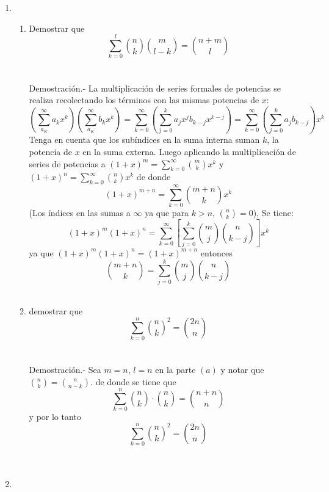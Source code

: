 \begin{enumerate}[\bfseries 1.]
      \item 
        \begin{enumerate}[\bfseries (a)]
        \item Demostrar que $$\displaystyle\sum_{k=0}^{l} {n \choose k} {m \choose l-k} = {n+m \choose l}$$\\\\
        Demostración.- \; La multiplicación de series formales de potencias se realiza recolectando los términos con las mismas potencias de $x$: 
        $$\left( \sum\limits_{a_K}^{\infty} a_k x^k \right) \left( \sum\limits_{a_K}^{\infty} b_k x^k \right) = \sum\limits_{k=0}^{\infty} \left(\sum\limits_{j=0}^{k} a_j x^j b_{k-j} x^{k-j}  \right) = \sum\limits_{k=0}^{\infty} \left(\sum\limits_{j=0}^{k} a_j  b_{k-j}   \right) x^k$$
        Tenga en cuenta que los subíndices en la suma interna suman $k$, la potencia de $x$ en la suma externa.
        Luego aplicando la multiplicación de series de potencias a $(1+x)^m = \sum\limits_{k=0}^{\infty} {m \choose k}x^k$ y $(1+x)^n = \sum\limits_{k=0}^{\infty} {n \choose k}x^k$ de donde $$(1+x)^{m+n} = \sum\limits_{k=0}^{\infty} {m+n \choose k }x^k$$
        (Los índices en las sumas a $\infty$ ya que para $k>n$, ${n  \choose k} =0$), Se tiene:
        $$(1+x)^m (1+x)^n = \sum\limits_{k=0}^{\infty} \left[ \sum\limits_{j=0}^{k} {m \choose j} {n \choose k-j} \right]x^k$$
        ya que $(1+x)^m (1+x)^n = (1+x)^{m+n}$ entonces $${m+n \choose k} = \sum\limits_{j=0}^{k} {m \choose j} {n \choose k-j}$$\\ 
        

        \item demostrar que $$\displaystyle\sum_{k=0}^{n} {n \choose k}^2 = {2n \choose n}$$\\\\
        Demostración.- \; Sea $m=n$, $l=n$ en la parte $(a)$ y notar que ${n \choose k} = {n \choose n-k}.$ de donde se tiene que $$ \sum\limits_{k=0}^{n} {n \choose k} \cdot  {n \choose k} = {n+n \choose n}$$ y por lo tanto $$\sum\limits_{k=0}^{n} {n \choose k}^2 = {2n \choose n}$$\\\\  
        
        \end{enumerate}

     \item \begin{enumerate}[\bfseries (a)] 


\end{enumerate}
\end{enumerate}
